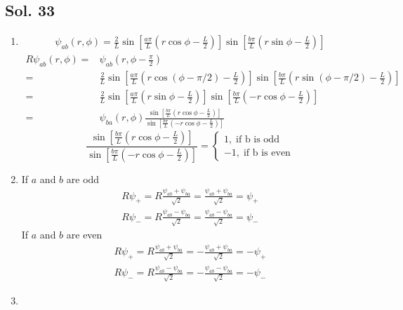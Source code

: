 \subsection*{Sol. 33}
\begin{enumerate}
    \item 
    \begin{align*}
    \psi_{ab}(r,\phi) = 
    \frac{2}{L}
    \sin\left[\frac{a\pi}{L}(r\cos\phi-\frac{L}{2})\right]
    \sin\left[\frac{b\pi}{L}(r\sin\phi-\frac{L}{2})\right]
\end{align*}
\begin{align*}
    R\psi_{ab}(r,\phi)
    =&\psi_{ab}(r,\phi-\frac{\pi}{2})\\
    =&
    \frac{2}{L}
    \sin\left[\frac{a\pi}{L}(r\cos(\phi-\pi/2)-\frac{L}{2})\right]
    \sin\left[\frac{b\pi}{L}(r\sin(\phi-\pi/2)-\frac{L}{2})\right]\\
    =&
    \frac{2}{L}
    \sin\left[\frac{a\pi}{L}(r\sin\phi-\frac{L}{2})\right]
    \sin\left[\frac{b\pi}{L}(-r\cos\phi-\frac{L}{2})\right]\\
    =&\psi_{ba}(r,\phi)
    \frac{\sin\left[\frac{b\pi}{L}(r\cos\phi-\frac{L}{2})\right]}{\sin\left[\frac{b\pi}{L}(-r\cos\phi-\frac{L}{2})\right]}
\end{align*}
$$
\frac{\sin\left[\frac{b\pi}{L}(r\cos\phi-\frac{L}{2})\right]}{\sin\left[\frac{b\pi}{L}(-r\cos\phi-\frac{L}{2})\right]}= 
\begin{cases}
1,\;\text{if b is odd}\\
-1,\;\text{if b is even}
\end{cases}
$$

\item 
If $a$ and $b$ are odd 
\begin{align*}
    R\psi_+=R\frac{\psi_{ab}+\psi_{ba}}{\sqrt{2}}
    =\frac{\psi_{ab}+\psi_{ba}}{\sqrt{2}}=\psi_+
\end{align*}
\begin{align*}
    R\psi_-=R\frac{\psi_{ab}-\psi_{ba}}{\sqrt{2}}
    =\frac{\psi_{ab}-\psi_{ba}}{\sqrt{2}}=\psi_-
\end{align*}
If $a$ and $b$ are even 
\begin{align*}
    R\psi_+=R\frac{\psi_{ab}+\psi_{ba}}{\sqrt{2}}
    =-\frac{\psi_{ab}+\psi_{ba}}{\sqrt{2}}=-\psi_+
\end{align*}
\begin{align*}
    R\psi_-=R\frac{\psi_{ab}-\psi_{ba}}{\sqrt{2}}
    =-\frac{\psi_{ab}-\psi_{ba}}{\sqrt{2}}=-\psi_-
\end{align*}
\item 
{}
\end{enumerate}


